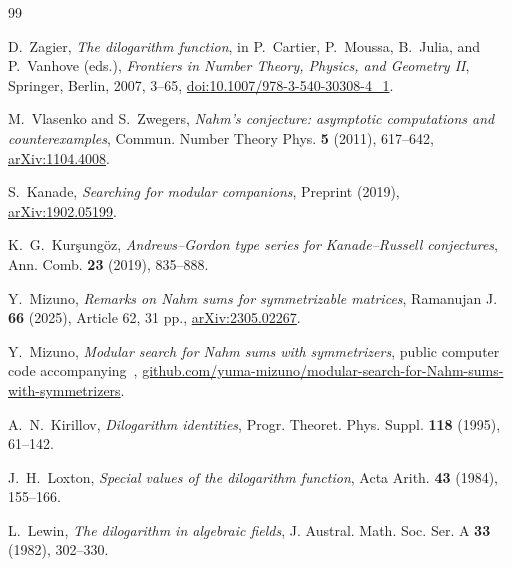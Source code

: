 \documentclass[preprint,12pt,number]{elsarticle}
\theoremstyle{remark}
\begin{document}
\begin{thebibliography}{99}

D.~Zagier,
\emph{The dilogarithm function},
in P.~Cartier, P.~Moussa, B.~Julia, and P.~Vanhove (eds.),
\emph{Frontiers in Number Theory, Physics, and Geometry II},
Springer, Berlin, 2007, 3--65,
\href{https://doi.org/10.1007/978-3-540-30308-4_1}
{doi:10.1007/978-3-540-30308-4\_1}.

M.~Vlasenko and S.~Zwegers,
\emph{Nahm's conjecture: asymptotic computations and counterexamples},
Commun. Number Theory Phys. \textbf{5} (2011), 617--642,
\href{https://arxiv.org/abs/1104.4008}{arXiv:1104.4008}.

S.~Kanade,
\emph{Searching for modular companions},
Preprint (2019),
\href{https://arxiv.org/abs/1902.05199}{arXiv:1902.05199}.

K.~G.~Kur\c{s}ung\"oz,
\emph{Andrews--Gordon type series for Kanade--Russell conjectures},
Ann. Comb. \textbf{23} (2019), 835--888.

Y.~Mizuno,
\emph{Remarks on Nahm sums for symmetrizable matrices},
Ramanujan J. \textbf{66} (2025), Article 62, 31 pp.,
\href{https://arxiv.org/abs/2305.02267}{arXiv:2305.02267}.

Y.~Mizuno,
\emph{Modular search for Nahm sums with symmetrizers},
public computer code accompanying~\cite{Mizuno},
\href{https://github.com/yuma-mizuno/modular-search-for-Nahm-sums-with-symmetrizers}
{github.com/yuma-mizuno/modular-search-for-Nahm-sums-with-symmetrizers}.


A.~N.~Kirillov,
\emph{Dilogarithm identities},
Progr. Theoret. Phys. Suppl. \textbf{118} (1995), 61--142.



J.~H.~Loxton,
\emph{Special values of the dilogarithm function},
Acta Arith. \textbf{43} (1984), 155--166.

L.~Lewin,
\emph{The dilogarithm in algebraic fields},
J. Austral. Math. Soc. Ser. A \textbf{33} (1982), 302--330.




\end{thebibliography}
\end{document}
